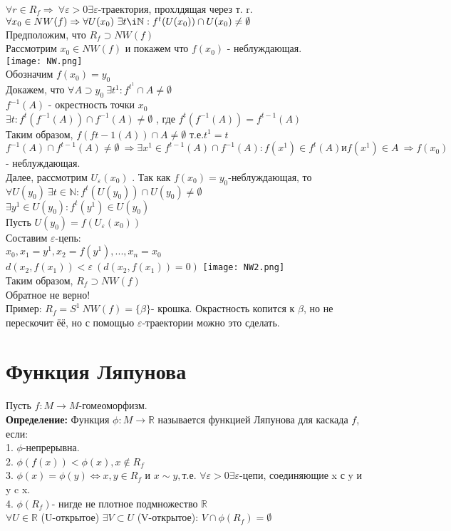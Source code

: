 \documentclass[12pt,a4paper]{article}
\begin{document}
\(\forall r \in R_f \Rightarrow \ \forall \varepsilon >0 \exists \varepsilon\)-траектория, прохлдящая через т. r.
\\
\(\forall x_0 \in NW(f) \Rightarrow \forall U(x_0) \ \exists t \i\mathbb{N} : f^t(U(x_0))\cap U(x_0)\neq \emptyset\) \\
Предположим, что \(R_f \supset NW(f)\) \\
Рассмотрим \(x_0 \in NW(f)\) и покажем что \(f(x_0)\) - неблуждающая. \\
\texttt{[image: NW.png]}\\
Обозначим \(f(x_0) = y_0\)\\
Докажем, что \(\forall A \supset y_0 \ \exists t^1 : f^{t^1}\cap A \neq \emptyset\)\\
\(f^{-1}(A)\) - окрестность точки \(x_0\)\\
\( \exists t : f^t(f^{-1}(A))\cap f^{-1}(A) \neq \emptyset\) , где \(f^t(f^{-1}(A)) = f^{t-1}(A)\)
\\
Таким образом, \(f(f{t-1}(A)) \cap A \neq \emptyset\) т.е.\(t^1 = t\)\\
\(f^{-1}(A) \cap f^{t-1}(A) \neq \emptyset \ \Rightarrow \exists x^1 \in f^{t-1}(A) \cap f^{-1}(A): f(x^1)\in f^t(A) и f(x^1)\in A \ \Rightarrow f(x_0)\)- неблуждающая. \\
Далее, рассмотрим \(U_\varepsilon (x_0)\) . Так как \(f(x_0)=y_0\)-неблуждающая, то \(\forall U(y_0) \ \exists t\in \mathbb{N}: f^t(U(y_0))\cap U(y_0) \neq \emptyset\)\\
\( \exists y^1\in U(y_0): f^t(y^1)\in U(y_0)\)\\
Пусть \(U(y_0)=f(U_\varepsilon (x_0))\) \\
Составим \(\varepsilon\)-цепь: \\
\(x_0,x_1 = y^1,x_2 = f(y^1),...,x_n=x_0 \)\\
\(d(x_2,f(x_1))<\varepsilon \ (d(x_2,f(x_1))=0)\)
\texttt{[image: NW2.png]}\\
Таким образом, \(R_f\supset NW(f)\)\\
Обратное не верно! \\
Пример: \(R_f = S^1 \ NW(f)=\{\beta\}\)- крошка. Окрастность копится к \(\beta\), но не перескочит ёё, но с помощью \(\varepsilon\)-траектории можно это сделать. 
\newpage
\section*{Функция Ляпунова}
 Пусть \(f:M \to M\)-гомеоморфизм.\\
\textbf{Определение: }Функция \(\phi:M \to \mathbb{R}\) называется функцией Ляпунова для каскада \(f\), если:\\
1. \(\phi\)-непрерывна.\\
2. \(\phi(f(x))<\phi(x), x \notin R_f\)\\
3. \(\phi(x)=\phi(y) \Leftrightarrow x,y \in R_f\) и \(x\sim y,\)т.е. \(\forall \varepsilon >0 \exists \varepsilon\)-цепи, соединяющие x с y и y c x.\\
4. \(\phi(R_f)\)- нигде не плотное подмножество \(\mathbb{R}\)\\
\(\forall U\in \mathbb{R}\) (U-открытое) \(\exists V \subset U\) (V-открытое): \(V\cap \phi(R_f)=\emptyset\)
\end{document}

